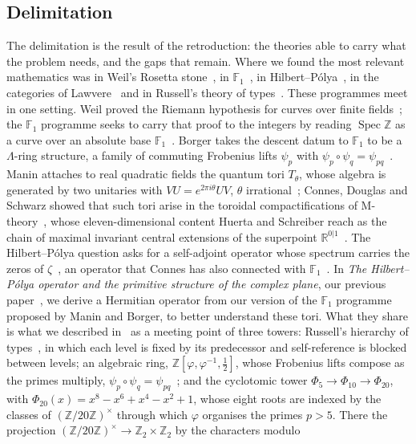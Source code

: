 \documentclass[11pt,reqno]{amsart}
\newcommand{\golden}{\varphi}
\numberwithin{equation}{section}
\theoremstyle{remark}
\begin{document}
\subsection{Delimitation}
The delimitation is the result of the retroduction: the theories able to carry
what the problem needs, and the gaps that remain. Where we found the most relevant mathematics was in
Weil's Rosetta stone~\cite{Wei40}, in $\mathbb F_1$~\cite{Tit57,CC10,F1}, in Hilbert--P\'olya~\cite{Mon73,BK99,HP26}, in the
categories of Lawvere~\cite{Law64} and in Russell's theory of types~\cite{Rus08}.
These programmes meet in one setting. Weil proved the Riemann hypothesis for curves over finite
fields~\cite{Wei48}; the $\mathbb F_1$ programme seeks to carry that proof to the integers by reading
$\operatorname{Spec}\mathbb Z$ as a curve over an absolute base $\mathbb F_1$~\cite{F1}. Borger takes
the descent datum to $\mathbb F_1$ to be a $\Lambda$-ring structure, a family of commuting Frobenius
lifts $\psi_p$ with $\psi_p\circ\psi_q=\psi_{pq}$~\cite{Bor09}. Manin attaches to real quadratic fields
the quantum tori $T_\theta$, whose algebra is generated by two unitaries with $VU=e^{2\pi i\theta}UV$,
$\theta$ irrational~\cite{Man04}; Connes, Douglas and Schwarz showed that such tori arise in the
toroidal compactifications of M-theory~\cite{CDS98}, whose eleven-dimensional content Huerta and
Schreiber reach as the chain of maximal invariant central extensions of the superpoint
$\mathbb R^{0|1}$~\cite{HS18}. The Hilbert--P\'olya question asks for a self-adjoint operator whose
spectrum carries the zeros of $\zeta$~\cite{Mon73,BK99}, an operator that Connes has also connected
with $\mathbb F_1$~\cite{Con99,CC10}. In \emph{The Hilbert--P\'olya operator and the primitive
structure of the complex plane}, our previous paper~\cite{HP26}, we derive a Hermitian operator from
our version of the $\mathbb F_1$ programme proposed by Manin and Borger, to better understand these
tori. What they share is what we described in~\cite{HP26} as a meeting point of three towers: Russell's
hierarchy of types~\cite{Rus08}, in which each level is fixed by its predecessor and self-reference is
blocked between levels; an algebraic ring, $\mathbb Z[\golden,\golden^{-1},\tfrac12]$, whose
Frobenius lifts compose as the primes multiply, $\psi_p\circ\psi_q=\psi_{pq}$~\cite{Bor09}; and the
cyclotomic tower $\Phi_5\to\Phi_{10}\to\Phi_{20}$, with
$\Phi_{20}(x)=x^8-x^6+x^4-x^2+1$, whose eight roots are indexed by the classes of
$(\mathbb Z/20\mathbb Z)^\times$ through which $\golden$ organises the primes $p>5$. There the
projection $(\mathbb Z/20\mathbb Z)^\times\to\mathbb Z_2\times\mathbb Z_2$ by the characters modulo
\end{document}
